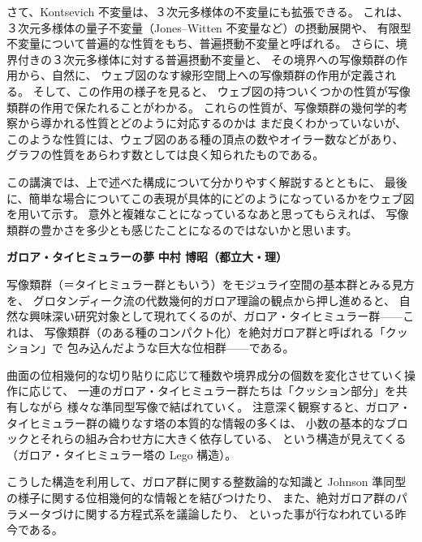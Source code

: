 \documentclass[uplatex,dvipdfmx]{jlreq}
\begin{document}
さて、Kontsevich 不変量は、３次元多様体の不変量にも拡張できる。
これは、３次元多様体の量子不変量（Jones--Witten 不変量など）の摂動展開や、
有限型不変量について普遍的な性質をもち、普遍摂動不変量と呼ばれる。
さらに、境界付きの３次元多様体に対する普遍摂動不変量と、
その境界への写像類群の作用から、自然に、
ウェブ図のなす線形空間上への写像類群の作用が定義される。
そして、この作用の様子を見ると、
ウェブ図の持ついくつかの性質が写像類群の作用で保たれることがわかる。
これらの性質が、写像類群の幾何学的考察から導かれる性質とどのように対応するのかは
まだ良くわかっていないが、
このような性質には、ウェブ図のある種の頂点の数やオイラー数などがあり、
グラフの性質をあらわす数としては良く知られたものである。

この講演では、上で述べた構成について分かりやすく解説するとともに、
最後に、簡単な場合についてこの表現が具体的にどのようになっているかをウェブ図を用いて示す。
意外と複雑なことになっているなあと思ってもらえれば、
写像類群の豊かさを多少とも感じたことになるのではないかと思います。

\newpage

\noindent
{\large\bfseries ガロア・タイヒミュラーの夢}
\hfill
{\large\bfseries 中村 博昭（都立大・理）}

\medskip

写像類群（＝タイヒミュラー群ともいう）をモジュライ空間の基本群とみる見方を、
グロタンディーク流の代数幾何的ガロア理論の観点から押し進めると、
自然な興味深い研究対象として現れてくるのが、ガロア・タイヒミュラー群——これは、
写像類群（のある種のコンパクト化）を絶対ガロア群と呼ばれる「クッション」で
包み込んだような巨大な位相群——である。

曲面の位相幾何的な切り貼りに応じて種数や境界成分の個数を変化させていく操作に応じて、
一連のガロア・タイヒミュラー群たちは「クッション部分」を共有しながら
様々な準同型写像で結ばれていく。
注意深く観察すると、ガロア・タイヒミュラー群の織りなす塔の本質的な情報の多くは、
小数の基本的なブロックとそれらの組み合わせ方に大きく依存している、
という構造が見えてくる（ガロア・タイヒミュラー塔の Lego 構造）。

こうした構造を利用して、ガロア群に関する整数論的な知識と
Johnson 準同型の様子に関する位相幾何的な情報とを結びつけたり、
また、絶対ガロア群のパラメータづけに関する方程式系を議論したり、
といった事が行なわれている昨今である。
\end{document}
